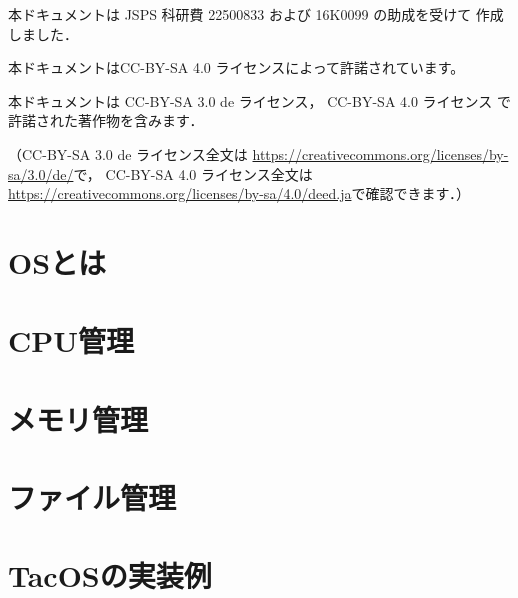 \documentclass[a4paper,11pt,twocolumn]{ltjsbook}     %
\begin{document}
本ドキュメントは JSPS 科研費 22500833 および 16K0099 の助成を受けて
作成しました．
\vspace{0.8cm}

本ドキュメントはCC-BY-SA 4.0 ライセンスによって許諾されています。

本ドキュメントは
CC-BY-SA 3.0 de ライセンス，
CC-BY-SA 4.0 ライセンス
で許諾された著作物を含みます．

（CC-BY-SA 3.0 de ライセンス全文は
\url{https://creativecommons.org/licenses/by-sa/3.0/de/}で，
CC-BY-SA 4.0 ライセンス全文は
\url{https://creativecommons.org/licenses/by-sa/4.0/deed.ja}で確認できます．）

\setcounter{tocdepth}{2}
\tableofcontents

\mainmatter

\part{OSとは}

\part{CPU管理}

\part{メモリ管理}
\label{memoryManagement}

\part{ファイル管理}

\part{TacOSの実装例}
\end{document}
